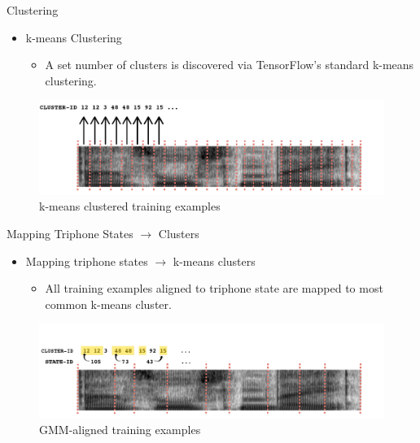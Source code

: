 \documentclass[final]{beamer} %
\begin{document}
\begin{frame}
\begin{columns}
\begin{column}{0.23\textwidth}
{\begin{block}{\boxnumber Clustering}
          \begin{itemize}
          \item k-means Clustering
            \begin{itemize}
            \item A set number of clusters is discovered via TensorFlow's standard k-means clustering.
            \end{itemize}
          \end{itemize}
        \end{block}

        \vfill
        
        \begin{figure}[!htbp]
          \centering
          \includegraphics[width=\linewidth]{figs/clustered.png}
          \caption{k-means clustered training examples}
          \endminipage\hfill
        \end{figure}
        
        \vfill
        
        \begin{block}{\boxnumber Mapping Triphone States $\rightarrow$ Clusters}          
          \begin{itemize}
          \item Mapping triphone states $\rightarrow$ k-means clusters
            \begin{itemize}
            \item All training examples aligned to triphone state are mapped to most common k-means cluster.
            \end{itemize}
          \end{itemize}
        \end{block}

        \vfill
        
        \begin{figure}[!htbp]
          \centering
          \includegraphics[width=\linewidth]{figs/mapped.png}
          \caption{GMM-aligned training examples}
          \endminipage\hfill
        \end{figure}
        
}
\end{column}
\end{columns}
\end{frame}
\end{document}

